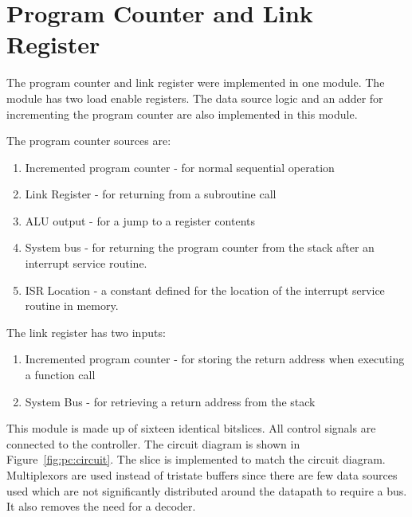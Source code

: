 
\section{Program Counter and Link Register}


The program counter and link register were implemented in one module.
The module has two load enable registers. 
The data source logic and an adder for incrementing the program counter are also implemented in this module.

The program counter sources are:
\begin{enumerate}
\item Incremented program counter - for normal sequential operation
\item Link Register - for returning from a subroutine call
\item ALU output - for a jump to a register contents
\item System bus - for returning the program counter from the stack after an interrupt service routine.
\item ISR Location - a constant defined for the location of the interrupt service routine in memory.
\end{enumerate}

The link register has two inputs:
\begin{enumerate}
\item Incremented program counter - for storing the return address when executing a function call
\item System Bus - for retrieving a return address from the stack 
\end{enumerate}

This module is made up of sixteen identical bitslices. 
All control signals are connected to the controller. %
The circuit diagram is shown in Figure~\ref{fig:pc:circuit}.
The slice is implemented to match the circuit diagram. 
Multiplexors are used instead of tristate buffers since there are few data sources used which are not significantly distributed around the datapath to require a bus. 
It also removes the need for a decoder.

